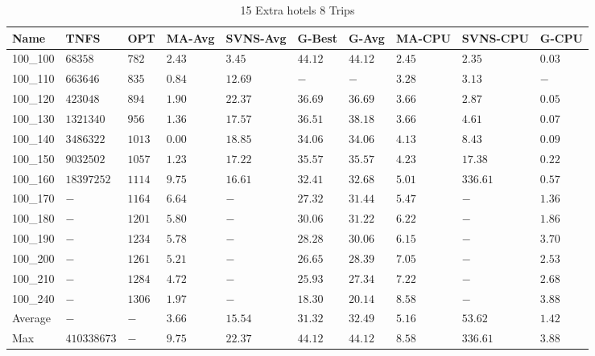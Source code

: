 \begin{center}
    \begin{table}[]
    \centering
    \begin{adjustwidth}{-0.4in}{-1in}
    \begin{tabular}{|lll|l|l|ll|lll|}
\hline
Name     & TNFS        & OPT    & MA-Avg & SVNS-Avg & G-Best & G-Avg & MA-CPU  & SVNS-CPU & G-CPU \\
\hline
100\_100 & $68358    $ & $782 $ & $2.43$ & $3.45 $  & $44.12$    & $44.12$   & $2.45$  & $2.35  $ & $0.03$ \\
100\_110 & $663646   $ & $835 $ & $0.84$ & $12.69$  & $-    $    & $-    $   & $3.28$  & $3.13  $ & $-   $ \\
100\_120 & $423048   $ & $894 $ & $1.90$ & $22.37$  & $36.69$    & $36.69$   & $3.66$  & $2.87  $ & $0.05$ \\
100\_130 & $1321340  $ & $956 $ & $1.36$ & $17.57$  & $36.51$    & $38.18$   & $3.66$  & $4.61  $ & $0.07$ \\
100\_140 & $3486322  $ & $1013$ & $\bm{0.00}$ & $18.85$  & $34.06$    & $34.06$   & $4.13$  & $8.43  $ & $0.09$ \\
100\_150 & $9032502  $ & $1057$ & $1.23$ & $17.22$  & $35.57$    & $35.57$   & $4.23$  & $17.38 $ & $0.22$ \\
100\_160 & $18397252 $ & $1114$ & $9.75$ & $16.61$  & $32.41$    & $32.68$   & $5.01$  & $336.61$ & $0.57$ \\
100\_170 & $-        $ & $1164$ & $6.64$ & $-    $  & $27.32$    & $31.44$   & $5.47$  & $-     $ & $1.36$ \\
100\_180 & $-        $ & $1201$ & $5.80$ & $-    $  & $30.06$    & $31.22$   & $6.22$  & $-     $ & $1.86$ \\
100\_190 & $-        $ & $1234$ & $5.78$ & $-    $  & $28.28$    & $30.06$   & $6.15$  & $-     $ & $3.70$ \\
100\_200 & $-        $ & $1261$ & $5.21$ & $-    $  & $26.65$    & $28.39$   & $7.05$  & $-     $ & $2.53$ \\
100\_210 & $-        $ & $1284$ & $4.72$ & $-    $  & $25.93$    & $27.34$   & $7.22$  & $-     $ & $2.68$ \\
100\_240 & $-        $ & $1306$ & $1.97$ & $-    $  & $18.30$    & $20.14$   & $8.58$  & $-     $ & $3.88$ \\
\hline
Average  & $-        $ & $-   $ & $3.66$ & $15.54$  & $31.32$    & $32.49$   & $5.16$  & $53.62 $ & $1.42$ \\
Max      & $410338673$ & $-   $ & $9.75$ & $22.37$  & $44.12$    & $44.12$   & $8.58$  & $336.61$ & $3.88$ \\
\hline
\end{tabular}
    \end{adjustwidth}
    \caption{15 Extra hotels 8 Trips}
    \label{15-8}
    \end{table}
\end{center}
